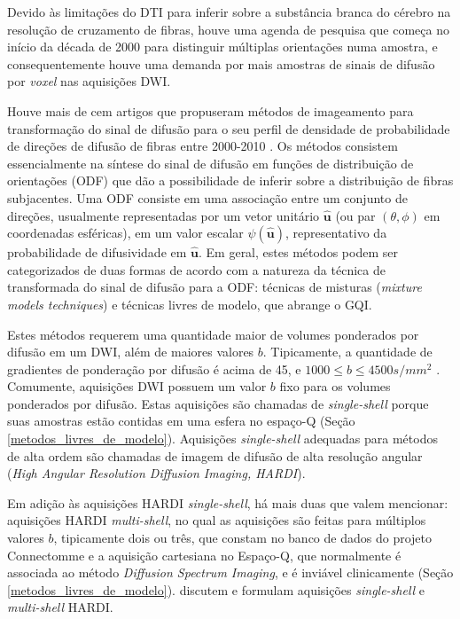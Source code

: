 \documentclass[
    12pt,                %
    oneside,            %
    a4paper,            %
    english,            %
    french,                %
    spanish,            %
    brazil                %
    ]{abntex2}
\begin{document}
Devido às limitações do DTI para inferir sobre a substância branca do cérebro na resolução de cruzamento de fibras, houve uma agenda de pesquisa que começa no início da década de 2000 para distinguir múltiplas orientações numa amostra, e consequentemente houve uma demanda por mais amostras de sinais de difusão por \textit{voxel} nas aquisições DWI. %

Houve mais de cem artigos que propuseram métodos de imageamento para transformação do sinal de difusão para o seu perfil de densidade de probabilidade de direções de difusão de fibras entre 2000-2010 \cite{descoteaux2015}. Os métodos consistem essencialmente na síntese do sinal de difusão em funções de distribuição de orientações (ODF) que dão a possibilidade de inferir sobre a distribuição de fibras subjacentes. Uma ODF consiste em uma associação entre um conjunto de direções, usualmente representadas por um vetor unitário $\mathbf{\hat{u}}$ (ou par $(\theta, \phi)$ em coordenadas esféricas), em um valor escalar $\psi(\mathbf{\hat{u}})$, representativo da probabilidade de difusividade em $\mathbf{\hat{u}}$. Em geral, estes métodos podem ser categorizados de duas formas de acordo com a natureza da técnica de transformada do sinal de difusão para a ODF: técnicas de misturas (\textit{mixture models techniques}) e técnicas livres de modelo, que abrange o GQI.

Estes métodos requerem uma quantidade maior de volumes ponderados por difusão em um DWI, além de maiores valores $b$. Tipicamente, a quantidade de gradientes de ponderação por difusão é acima de 45, e $1000 \leq b \leq 4500s/mm^2$ \cite{descoteaux2015}. Comumente, aquisições DWI possuem um valor $b$ fixo para os volumes ponderados por difusão. Estas aquisições são chamadas de \textit{single-shell} porque suas amostras estão contidas em uma esfera no espaço-Q (Seção \ref{metodos_livres_de_modelo}). Aquisições \textit{single-shell} adequadas para métodos de alta ordem são chamadas de imagem de difusão de alta resolução angular (\textit{High Angular Resolution Diffusion Imaging, HARDI}).

Em adição às aquisições HARDI \textit{single-shell}, há mais duas que valem mencionar: aquisições HARDI \textit{multi-shell}, no qual as aquisições são feitas para múltiplos valores $b$, tipicamente dois ou três, que constam no banco de dados do projeto Connectomme \cite{essen2012} e a aquisição cartesiana no Espaço-Q, que normalmente é associada ao método \textit{Diffusion Spectrum Imaging}, e é inviável clinicamente (Seção \ref{metodos_livres_de_modelo}).  discutem e formulam aquisições \textit{single-shell} e \textit{multi-shell} HARDI.
\end{document}
